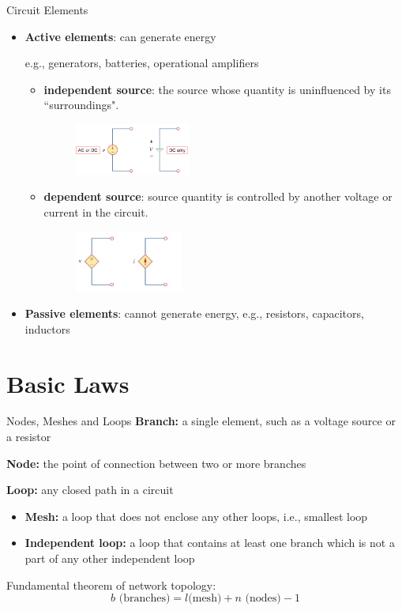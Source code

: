 \documentclass{beamer}
\begin{document}
\begin{frame}{Circuit Elements}

\begin{itemize}
\item \textbf{Active elements}: can generate energy

e.g., generators, batteries, operational amplifiers

\begin{itemize}
\item \textbf{independent source}: the source whose quantity is uninfluenced by its ``surroundings".
\begin{figure}
\flushleft
\includegraphics[width=1.5in]{12.png}
\end{figure}
\item \textbf{dependent source}: source quantity is controlled by another voltage or current in the circuit.
\begin{figure}
\flushleft
\includegraphics[width=1.4in]{13.png}
\end{figure}
\end{itemize}
\item \textbf{Passive elements}: cannot generate energy,
\newline
e.g., resistors, capacitors, inductors
\newline
\end{itemize}
\end{frame}

\section{Basic Laws}

\begin{frame}{Nodes, Meshes and Loops}
\textbf{Branch:} a single element, such as a voltage source or a resistor

\textbf{Node:} the point of connection between two or more branches

\textbf{Loop:} any closed path in a circuit
\begin{itemize}
\item \textbf{Mesh:} a loop that does not enclose any other 
loops, i.e., smallest loop
\item \textbf{Independent loop:} a loop that contains at least one branch which is not a part of any other independent loop
\end{itemize}


Fundamental theorem of network topology:
$$b\text{ (branches)}=l\text{(mesh)}+n\text{ (nodes)}-1$$
\end{frame}
\end{document}
